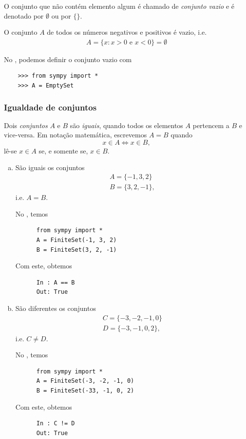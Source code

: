 O conjunto que não contém elemento algum é chamado de \emph{conjunto vazio} e é denotado por $\emptyset$ ou por $\{\}$.

\begin{ex}
  O conjunto $A$ de todos os números negativos e positivos é vazio, i.e.
  \begin{gather}
    A = \{x: x>0\text{ e }x<0\} = \emptyset
  \end{gather}

  \ifispython
  No \python, podemos definir o conjunto vazio com
  \begin{lstlisting}
    >>> from sympy import *
    >>> A = EmptySet
  \end{lstlisting}
  \fi
\end{ex}

\subsubsection{Igualdade de conjuntos}

Dois \emph{conjuntos} $A$ e $B$ são \emph{iguais}, quando todos os elementos $A$ pertencem a $B$ e vice-versa. Em notação matemática, escrevemos $A=B$ quando
\begin{equation}
  x\in A \Leftrightarrow x\in B,
\end{equation}
lê-se $x\in A$ se, e somente se, $x\in B$.

\begin{ex}
  \begin{enumerate}[a)]
  \item São iguais os conjuntos
    \begin{gather}
      A = \{-1, 3, 2\}\\
      B = \{3, 2, -1\},
    \end{gather}
    i.e. $A = B$.

    \ifispython
    No \python, temos
    \begin{lstlisting}
      from sympy import *
      A = FiniteSet(-1, 3, 2)
      B = FiniteSet(3, 2, -1)
    \end{lstlisting}
    Com este, obtemos
    \begin{lstlisting}
      In : A == B
      Out: True
    \end{lstlisting}
    \fi

  \item São diferentes os conjuntos
    \begin{gather}
      C = \{-3, -2, -1, 0\}\\
      D = \{-3, -1, 0, 2\},
    \end{gather}
    i.e. $C\neq D$.

    \ifispython
    No \python, temos
    \begin{lstlisting}
      from sympy import *
      A = FiniteSet(-3, -2, -1, 0)
      B = FiniteSet(-33, -1, 0, 2)
    \end{lstlisting}
    Com este, obtemos
    \begin{lstlisting}
      In : C != D
      Out: True
    \end{lstlisting}
    \fi
  \end{enumerate}
\end{ex}

